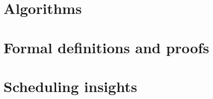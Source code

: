 \documentclass[USenglish,oneside,twocolumn]{article}
\begin{document}



%
\appendix
\section{Algorithms}
\label{sec:algorithms}


\section{Formal definitions and proofs}
\label{sec:proof}



\section{Scheduling insights}
\label{sec:scheduling}


\end{document}
